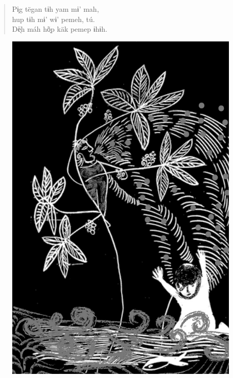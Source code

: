 \begin{verse}
Pɨ̗g tëgan tɨh yam mɨ’ mah,\\
hup tɨh mɨ’ wɨ’ pemeh, tú.\\
Dë̖h máh hõ̖p käk pemep ɨhɨh.
\end{verse}

\vspace*{\fill}

\begin{figure}
\vspace*{-1.5cm}
\hspace*{-2.4cm}\includegraphics[width=142mm]{./imgs/img2.jpg}
\end{figure}

\chapter*{}

